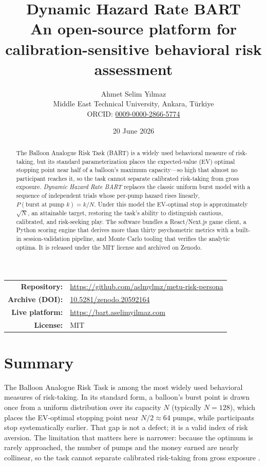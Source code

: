 \documentclass[11pt]{article}
\title{\textbf{Dynamic Hazard Rate BART}\\[2pt]
\large An open-source platform for calibration-sensitive behavioral risk assessment}
\author{Ahmet Selim Y\i lmaz\\[2pt]
  \small Middle East Technical University, Ankara, T\"urkiye\\
  \small ORCID: \href{https://orcid.org/0009-0000-2866-5774}{0009-0000-2866-5774}}
\date{20 June 2026}
\begin{document}
\maketitle

\begin{center}
\small
\begin{tabular}{rl}
\textbf{Repository:} & \url{https://github.com/aslmylmz/metu-risk-persona}\\
\textbf{Archive (DOI):} & \href{https://doi.org/10.5281/zenodo.20592164}{10.5281/zenodo.20592164}\\
\textbf{Live platform:} & \url{https://bart.aselimyilmaz.com}\\
\textbf{License:} & MIT\\
\end{tabular}
\end{center}

\begin{abstract}
\noindent The Balloon Analogue Risk Task (BART) is a widely used behavioral
measure of risk-taking, but its standard parameterization places the
expected-value (EV) optimal stopping point near half of a balloon's maximum
capacity---so high that almost no participant reaches it, so the task cannot
separate calibrated risk-taking from gross exposure. \emph{Dynamic Hazard Rate BART}
replaces the classic uniform burst model with a sequence of independent
trials whose per-pump hazard rises linearly, $P(\text{burst at pump }k)=k/N$.
Under this model the EV-optimal stop is approximately $\sqrt{N}$, an attainable
target, restoring the task's ability to distinguish cautious, calibrated, and
risk-seeking play. The software bundles a React/Next.js game client, a Python scoring
engine that derives more than thirty psychometric metrics with a built-in
session-validation pipeline, and Monte Carlo tooling that verifies the analytic
optima. It is released under the MIT license and archived on Zenodo.
\end{abstract}

\section{Summary}

The Balloon Analogue Risk Task \citep{lejuez2002} is among the most widely used
behavioral measures of risk-taking. In its standard form, a balloon's burst point
is drawn once from a uniform distribution over its capacity $N$ (typically
$N=128$), which places the EV-optimal stopping point near $N/2 \approx 64$ pumps,
while participants stop systematically earlier. That gap is not a defect; it is a
valid index of risk aversion. The limitation that matters here is narrower:
because the optimum is rarely approached, the number of pumps and the money
earned are nearly collinear, so the task cannot separate calibrated risk-taking
from gross exposure \citep{frey2017}.
\end{document}
